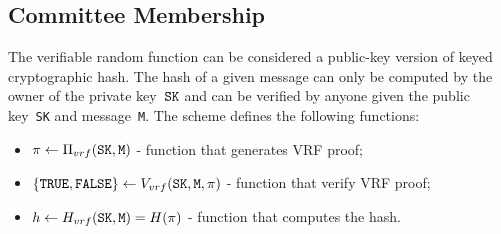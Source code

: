 \documentclass{article}
\begin{document}


\subsection{Committee Membership}
\label{sec:committee}
The verifiable random function can be considered a public-key version of keyed cryptographic hash. The hash of a given message can only be computed by the owner of the private key~${\tt SK}$ and can be verified by anyone given the public key~{\tt SK} and message~{\tt M}. The scheme defines the following functions:
\begin{itemize}
    \item $\pi\leftarrow\Pi_{vrf}({\tt SK},{\tt M})$ - function that generates VRF proof;
    \item $\{{\tt TRUE}, {\tt FALSE}\}\leftarrow V_{vrf}({\tt SK},{\tt M},\pi)$ - function that verify VRF proof;
    \item $h\leftarrow H_{vrf}({\tt SK},{\tt M})=H(\pi)$ - function that computes the hash.
\end{itemize}
\end{document}

